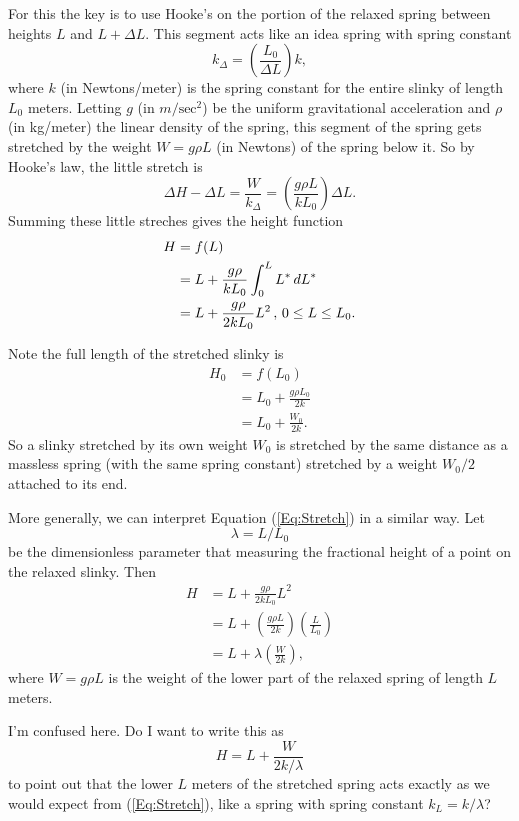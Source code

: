 \documentclass{ximera}
\begin{document}
For this the key is to use Hooke's on the portion of the relaxed spring between heights $L$ and $L+\Delta L$. This segment acts like an idea spring with spring constant
\[
        k_\Delta  =  \left( \frac{L_0}{\Delta L} \right) k,   
\]
where $k$ (in Newtons/meter) is the spring constant for the entire slinky of length $L_0$ meters. Letting $g$ (in $m/\text{sec}^2$) be the uniform gravitational acceleration and $\rho$ (in kg/meter) the linear density of the spring, this segment of the spring gets stretched by the weight $W =g \rho L$ (in Newtons) of the spring below it. So by Hooke's law, the little stretch is
\[
     \Delta H - \Delta L =  \frac{W}{k_\Delta} = \left( \frac{g\rho L}{k L_0} \right) \Delta L .
\]
Summing these little streches gives the height function
\begin{align}
    H &= f(L)   \notag  \\
        &= L +  \frac{g\rho}{k L_0} \int_0^L L^* \, dL^*  \notag \\
         & = L + \frac{g\rho}{2kL_0}L^2 \, , \, 0\leq L \leq L_0 .  \label{Eq:Stretch}
\end{align}

Note the full length of the stretched slinky is
\begin{align*}
   H_0 &= f(L_0)  \\
          &= L_0 + \frac{g\rho L_0}{2k} \\
          &= L_0 +  \frac{W_0}{2k}  .
\end{align*}
So a slinky stretched by its own weight $W_0$ is stretched by the same distance as a massless spring (with the same spring constant) stretched by a weight $W_0/2$ attached to its end.

More generally, we can interpret Equation (\ref{Eq:Stretch}) in a similar way. Let
\[
    \lambda = L/L_0
\]
be the dimensionless parameter that measuring the fractional height of a point on the relaxed slinky. Then 
\begin{align*}
       H  & = L + \frac{g\rho}{2kL_0}L^2 \\
           & =  L +   \left(\frac{g\rho L}{2k} \right) \left(\frac{L}{L_0}\right) \\
           & =  L + \lambda  \left(  \frac{W}{2k} \right) ,
\end{align*} 
where $W=g\rho L$ is the weight of the lower part of the relaxed spring of length $L$ meters.  

I'm confused here. Do I want to write this as
\[
           H = L +\frac{W}{2k/\lambda} 
\]
to point out that the lower $L$ meters of the stretched spring acts exactly as we would expect from (\ref{Eq:Stretch}), like a spring with spring constant $k_L = k/\lambda$?
\end{document}
